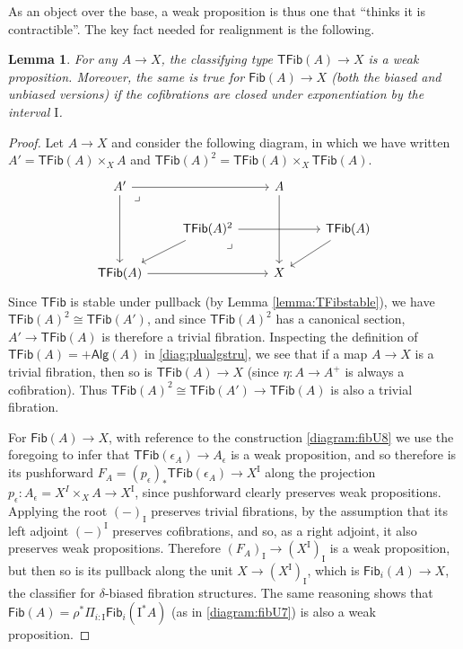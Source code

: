 \documentclass[12pt]{article}
\newcommand{\cof}{\ensuremath{\rightarrowtail}}
\renewcommand{\to}{\ensuremath{\rightarrow}}
\newcommand{\I}{\ensuremath{\mathrm{I}}}
\newcommand{\Fib}{\ensuremath{\mathsf{Fib}}}
\newcommand{\TFib}{\ensuremath{\mathsf{TFib}}}
\newtheorem{lemma}[theorem]{Lemma}
\theoremstyle{remark}
\theoremstyle{definition}
\newcommand{\pbmark}{\ar[dr, phantom, "\lrcorner" very near start, shift right=.5ex]}	%
\begin{document}
As an object over the base, a weak proposition is thus one that ``thinks it is contractible''.  The key fact needed for realignment is the following.

\begin{lemma}\label{lemma:Fibweakprop} For any $A\to X$, the classifying type $\TFib(A) \to X$ is a weak proposition.  Moreover, the same is true for $\Fib(A)\to X$ (both the biased and unbiased versions) if the cofibrations are closed under exponentiation by the interval $\I$.
\end{lemma}
%
%
\begin{proof}
Let $A\to X$ and consider the following diagram, in which we have written $A' = \TFib(A)\times_X A$ and $\TFib(A)^2 = \TFib(A)\times_X \TFib(A)$.
%
\begin{equation}\label{diagram:TFibweakprop}
\begin{tikzcd}
A' \ar[dd]  \ar[rr] \pbmark && A \ar[dd]  \\
& \TFib(A)^2 \ar[ld] \ar[rr]  \pbmark && \TFib(A) \ar[ld] \\
\TFib(A) \ar[rr] && X
\end{tikzcd}
\end{equation}
Since $\TFib$ is stable under pullback (by Lemma \ref{lemma:TFibstable}), we have $\TFib(A)^2 \cong \TFib(A')$, and since $\TFib(A)^2$ has a canonical section, $A' \to \TFib(A)$ is therefore a trivial fibration.  Inspecting the definition of $\TFib(A) = +\mathsf{Alg}(A)$ in \eqref{diag:plualgstru}, we see that if a map $A\to X$ is a trivial fibration, then so is $\TFib(A)\to X$ (since $\eta : A\to A^+$ is always a cofibration). Thus $\TFib(A)^2 \cong \TFib(A') \to\TFib(A)$ is also a trivial fibration.

For $\Fib(A)\to X$, with reference to the construction \eqref{diagram:fibU8} we use the foregoing to infer that $\TFib(\epsilon_A) \to A_\epsilon$ is a weak proposition, and so therefore is its pushforward $F_A = (p_\epsilon)_*\TFib(\epsilon_A)\to X^\I$ along the projection $p_\epsilon : A_\epsilon = X^I\times_X A \to X^\I$, since pushforward clearly preserves weak propositions.  Applying the root $(-)_\I$ preserves trivial fibrations, by the assumption that its left adjoint $(-)^\I$ preserves cofibrations, and so, as a right adjoint, it also preserves weak propositions. Therefore $(F_A)_\I \to (X^\I)_\I$ is a weak proposition, but then so is its pullback along the unit $X\to (X^\I)_\I$, which is $\Fib_i(A)\to X$, the classifier for $\delta$-biased fibration structures.  The same reasoning shows that $\Fib(A) = \rho^*\Pi_{i:\I}\Fib_i(\I^*A)$ (as in \eqref{diagram:fibU7}) is also a weak proposition.
\end{proof}
\end{document}
